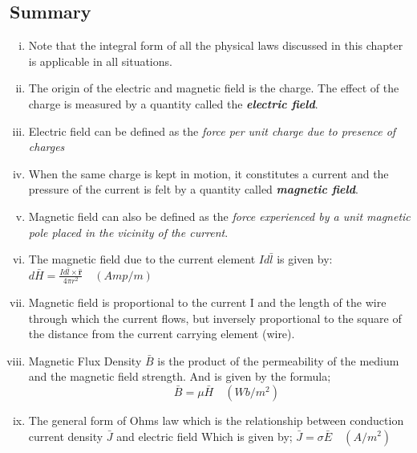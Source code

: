 \begin{mdframed}[backgroundcolor=lightblue, linewidth=1pt, hidealllines=true]
\section{Summary}
\begin{enumerate}[(i)]
	\item Note that the integral form of all the physical laws discussed in this chapter is applicable in all situations.
	
	\item The origin of the electric and magnetic field is the charge. The effect of the charge is measured by a quantity called the \textbf{\emph{electric field}}.
	
	\item Electric field can be defined as the \emph{force per unit charge due to presence of charges} 
	
	\item When the same charge is kept in motion, it constitutes a current and the pressure of the current is felt by a quantity called \textbf{\emph{magnetic field}}.
	
	\item Magnetic field can also be defined as the \emph{force experienced by a unit magnetic pole placed in the vicinity of the current}.
	
	\item The magnetic field due to the current element $Id\bar{l}$ is given by:
	$\boxed{d\bar{H}= \frac{Id\bar{l} \times \hat{\textbf{r}}}{4\pi r^{2}}}\quad (Amp/m)$ 
	
	\item Magnetic field is proportional to the current I and the length of the wire through which the current flows, but inversely proportional to the square of the distance from the current carrying element (wire).
	
	\item Magnetic Flux Density $\bar{B}$ is the product of the permeability of the medium and the magnetic field strength. And is given by the formula;
	$$\quad\boxed{\bar{B} = \mu\bar{H}}\quad (Wb/m^{2})$$
	
	\item The general form of Ohms law which is the relationship between conduction current density $\bar{J}$ and electric field Which is given by; $\boxed{\bar{J} = \sigma\bar{E}}\quad (A/m^{2})$
	

\end{enumerate}
\end{mdframed}
